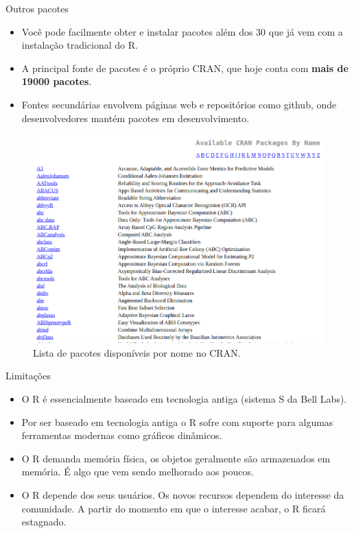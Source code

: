 \documentclass[
  ignorenonframetext,
  serif,
  professionalfont,
  usenames,
  dvipsnames,
  aspectratio = 169]{beamer}
\def\beginAHalfColumn{\begin{minipage}{0.49\textwidth}}%
\def\endColumns{\end{minipage}}%
\begin{document}
\begin{frame}{Outros pacotes}
\protect\hypertarget{outros-pacotes}{}
\beginAHalfColumn

\begin{itemize}
\item
  Você pode facilmente obter e instalar pacotes além dos 30 que já vem
  com a instalação tradicional do R.
\item
  A principal fonte de pacotes é o próprio CRAN, que hoje conta com
  \textbf{mais de 19000 pacotes}.
\item
  Fontes secundárias envolvem páginas web e repositórios como github,
  onde desenvolvedores mantém pacotes em desenvolvimento.
\end{itemize}

\endColumns
\beginAHalfColumn

\begin{figure}

{\centering \includegraphics[width=0.9\linewidth]{./img/list-packages} 

}

\caption{Lista de pacotes disponíveis por nome no CRAN.}\label{fig:unnamed-chunk-10}
\end{figure}

\endColumns
\end{frame}

\begin{frame}{Limitações}
\protect\hypertarget{limitauxe7uxf5es}{}
\begin{itemize}
\item
  O R é essencialmente baseado em tecnologia antiga (sistema S da Bell
  Labs).
\item
  Por ser baseado em tecnologia antiga o R sofre com suporte para
  algumas ferramentas modernas como gráficos dinâmicos.
\item
  O R demanda memória física, os objetos geralmente são armazenados em
  memória. É algo que vem sendo melhorado aos poucos.
\item
  O R depende dos seus usuários. Os novos recursos dependem do interesse
  da comunidade. A partir do momento em que o interesse acabar, o R
  ficará estagnado.
\end{itemize}
\end{frame}
\end{document}
